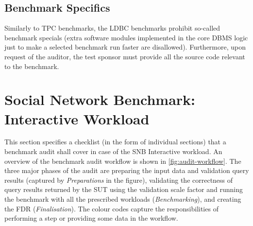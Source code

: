 \subsection{Benchmark Specifics}

Similarly to TPC benchmarks, the LDBC benchmarks prohibit so-called benchmark specials (\ie extra software modules implemented in the core DBMS logic just to make a selected benchmark run faster are disallowed). Furthermore, upon request of the auditor, the test sponsor must provide all the source code relevant to the benchmark.
    

\section{Social Network Benchmark: Interactive Workload}


This section specifies a checklist (in the form of individual sections) that a benchmark audit shall cover in case of the SNB Interactive workload. An overview of the benchmark audit workflow is shown in \autoref{fig:audit-workflow}. The three major phases of the audit are preparing the input data and validation query results (captured by \emph{Preparations} in the figure), validating the correctness of query results returned by the SUT using the validation scale factor and running the benchmark with all the prescribed workloads (\emph{Benchmarking}), and creating the FDR (\emph{Finalisation}). The colour codes capture the responsibilities of performing a step or providing some data in the workflow.


